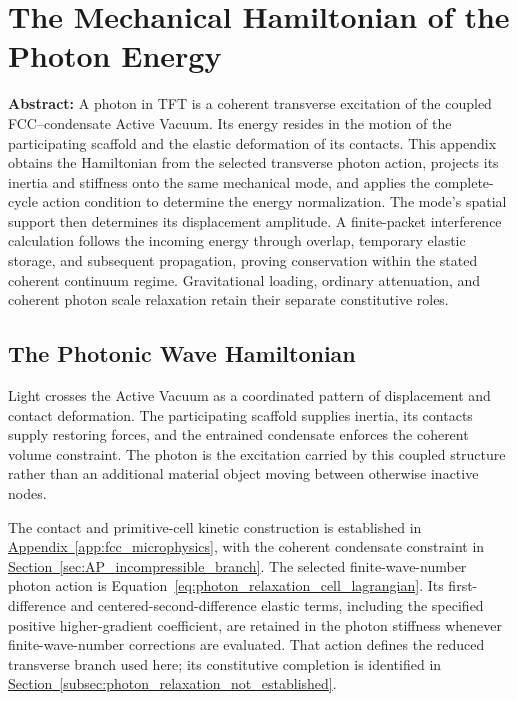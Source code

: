 \chapter{The Mechanical Hamiltonian of the Photon Energy}
\label{app:photon_hamiltonian}

\noindent\textbf{Abstract:}
A photon in TFT is a coherent transverse excitation of the coupled FCC--condensate Active Vacuum. Its energy resides in the motion of the participating scaffold and the elastic deformation of its contacts. This appendix obtains the Hamiltonian from the selected transverse photon action, projects its inertia and stiffness onto the same mechanical mode, and applies the complete-cycle action condition to determine the energy normalization. The mode's spatial support then determines its displacement amplitude. A finite-packet interference calculation follows the incoming energy through overlap, temporary elastic storage, and subsequent propagation, proving conservation within the stated coherent continuum regime. Gravitational loading, ordinary attenuation, and coherent photon scale relaxation retain their separate constitutive roles.

\section{The Photonic Wave Hamiltonian}

Light crosses the Active Vacuum as a coordinated pattern of displacement and contact deformation. The participating scaffold supplies inertia, its contacts supply restoring forces, and the entrained condensate enforces the coherent volume constraint. The photon is the excitation carried by this coupled structure rather than an additional material object moving between otherwise inactive nodes.

The contact and primitive-cell kinetic construction is established in \hyperref[app:fcc_microphysics]{Appendix~\ref*{app:fcc_microphysics}}, with the coherent condensate constraint in \hyperref[sec:AP_incompressible_branch]{Section~\ref*{sec:AP_incompressible_branch}}. The selected finite-wave-number photon action is Equation~\eqref{eq:photon_relaxation_cell_lagrangian}. Its first-difference and centered-second-difference elastic terms, including the specified positive higher-gradient coefficient, are retained in the photon stiffness whenever finite-wave-number corrections are evaluated. That action defines the reduced transverse branch used here; its constitutive completion is identified in \hyperref[subsec:photon_relaxation_not_established]{Section~\ref*{subsec:photon_relaxation_not_established}}.

